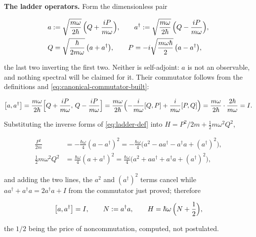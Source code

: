 \textbf{The ladder operators.} Form the dimensionless pair
\begin{linenomath}
    \begin{equation}
        \begin{split}
            &a := \sqrt{\frac{m\omega}{2\hbar}}\,\Bigl(Q + \frac{iP}{m\omega}\Bigr),
            \qquad
            a^\dagger := \sqrt{\frac{m\omega}{2\hbar}}\,\Bigl(Q - \frac{iP}{m\omega}\Bigr), \\
            &Q = \sqrt{\frac{\hbar}{2m\omega}}\,\bigl(a + a^\dagger\bigr),
            \qquad
            P = -i\sqrt{\frac{m\omega\hbar}{2}}\,\bigl(a - a^\dagger\bigr),
        \end{split}
        \label{eq:ladder-def}
    \end{equation}
\end{linenomath}
the last two inverting the first two. Neither is self-adjoint: $a$ is not an observable, and nothing spectral will be claimed for it. Their commutator follows from the definitions and \eqref{eq:canonical-commutator-built}:
\begin{linenomath}
    \begin{equation*}
        \bigl[a,a^\dagger\bigr]
        = \frac{m\omega}{2\hbar}\Bigl[Q+\frac{iP}{m\omega},\,Q-\frac{iP}{m\omega}\Bigr]
        = \frac{m\omega}{2\hbar}\Bigl(-\frac{i}{m\omega}[Q,P]+\frac{i}{m\omega}[P,Q]\Bigr)
        = \frac{m\omega}{2\hbar}\cdot\frac{2\hbar}{m\omega}=I.
    \end{equation*}
\end{linenomath}
Substituting the inverse forms of \eqref{eq:ladder-def} into $H=P^2/2m+\tfrac12 m\omega^2Q^2$,
\begin{linenomath}
    \begin{equation*}
        \begin{split}
            \frac{P^2}{2m}
            &= -\frac{\hbar\omega}{4}(a-a^\dagger)^2
             = -\frac{\hbar\omega}{4}\bigl(a^2-aa^\dagger-a^\dagger a+(a^\dagger)^2\bigr),\\[2pt]
            \frac{1}{2}m\omega^2Q^2
            &= \frac{\hbar\omega}{4}(a+a^\dagger)^2
             = \frac{\hbar\omega}{4}\bigl(a^2+aa^\dagger+a^\dagger a+(a^\dagger)^2\bigr),
        \end{split}
    \end{equation*}
\end{linenomath}
and adding the two lines, the $a^2$ and $(a^\dagger)^2$ terms cancel while $aa^\dagger+a^\dagger a=2a^\dagger a+I$ from the commutator just proved; therefore
\begin{linenomath}
    \begin{equation}
        \bigl[a,a^\dagger\bigr] = I,
        \qquad
        N := a^\dagger a,
        \qquad
        H = \hbar\omega\,\Bigl(N + \frac{1}{2}\Bigr),
        \label{eq:ladder-algebra}
    \end{equation}
\end{linenomath}
the $1/2$ being the price of noncommutation, computed, not postulated.

